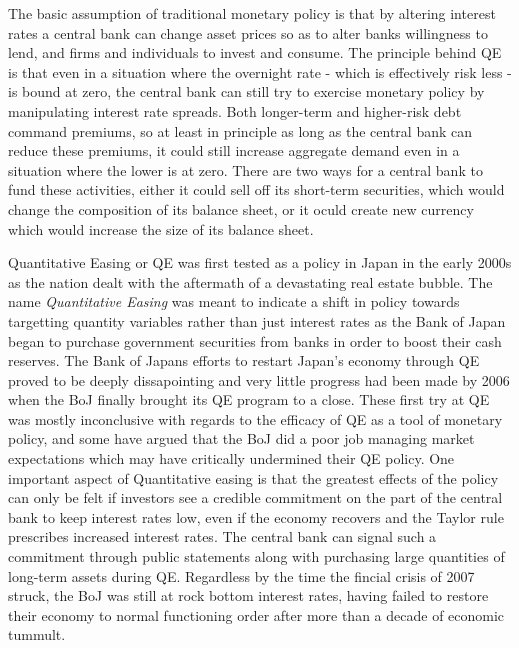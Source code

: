 \documentclass[12pt]{report}
\begin{document}

The basic assumption of traditional monetary policy is that by altering interest rates a central bank can change asset prices so as to alter banks willingness to lend, and firms and individuals to invest and consume.\autocite[51]{fawley2013four}
The principle behind QE is that even in a situation where the overnight rate - which is effectively risk less - is bound at zero, the central bank can still try to exercise monetary policy by manipulating interest rate spreads.\autocite[466]{blinder2010quantitative}
Both longer-term and higher-risk debt command premiums, so at least in principle as long as the central bank can reduce these premiums, it could still increase aggregate demand even in a situation where the lower is at zero.\autocite[466]{blinder2010quantitative}
There are two ways for a central bank to fund these activities, either it could sell off its short-term securities, which would change the composition of its balance sheet, or it oculd create new currency which would increase the size of its balance sheet.\autocite[467]{blinder2010quantitative}

Quantitative Easing or QE was first tested as a policy in Japan in the early 2000s as the nation dealt with the aftermath of a devastating real estate bubble.\autocite[274]{joyce2012quantitative}
The name \emph{Quantitative Easing} was meant to indicate a shift in policy towards targetting quantity variables rather than just interest rates as the Bank of Japan began to purchase government securities from banks in order to boost their cash reserves.\autocite[274]{joyce2012quantitative}
The Bank of Japans efforts to restart Japan's economy through QE proved to be deeply dissapointing and very little progress had been made by 2006 when the BoJ finally brought its QE program to a close.\autocite[55]{fawley2013four}
These first try at QE was mostly inconclusive with regards to the efficacy of QE as a tool of monetary policy, and some have argued that the BoJ did a poor job managing market expectations which may have critically undermined their QE policy.\autocite[55]{fawley2013four}
One important aspect of Quantitative easing is that the greatest effects of the policy can only be felt if investors see a credible commitment on the part of the central bank to keep interest rates low, even if the economy recovers and the Taylor rule prescribes increased interest rates.\autocite[4]{krishnamurthy2011effects}
The central bank can signal such a commitment through public statements along with purchasing large quantities of long-term assets during QE.\autocite[4]{krishnamurthy2011effects}
Regardless by the time the fincial crisis of 2007 struck, the BoJ was still at rock bottom interest rates, having failed to restore their economy to normal functioning order after more than a decade of economic tummult.\autocite[56]{fawley2013four}
\end{document}
